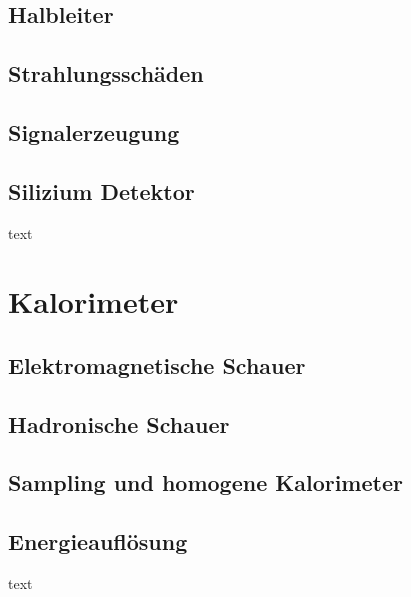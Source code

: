 \subsection{Halbleiter}
\subsection{Strahlungsschäden}
\subsection{Signalerzeugung}
\subsection{Silizium Detektor}
text
\section{Kalorimeter}
\subsection{Elektromagnetische Schauer}
\subsection{Hadronische Schauer}
\subsection{Sampling und homogene Kalorimeter}
\subsection{Energieauflösung}
text

